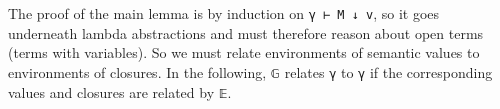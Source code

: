 The proof of the main lemma is by induction on \texttt{γ\ ⊢\ M\ ↓\ v},
so it goes underneath lambda abstractions and must therefore reason
about open terms (terms with variables). So we must relate environments
of semantic values to environments of closures. In the following,
\texttt{𝔾} relates \texttt{γ} to \texttt{γ\textquotesingle{}} if the
corresponding values and closures are related by \texttt{𝔼}.

\begin{fence}
\begin{code}%
\>[0]\AgdaSpace{}%
\AgdaSymbol{:}\AgdaSpace{}%
\AgdaSymbol{\}}\AgdaSpace{}%
\AgdaSpace{}%
\AgdaSpace{}%
\AgdaSpace{}%
\AgdaSpace{}%
\AgdaSpace{}%
\AgdaSpace{}%
\AgdaSpace{}%
\<%
\\
\>[0]\AgdaSpace{}%
\AgdaSymbol{\{}\AgdaSymbol{\}}\AgdaSpace{}%
\AgdaSpace{}%
\AgdaSpace{}%
\AgdaSymbol{=}\AgdaSpace{}%
\AgdaSpace{}%
\AgdaSymbol{:}\AgdaSpace{}%
\AgdaSpace{}%
\AgdaSpace{}%
\AgdaSymbol{\}}\AgdaSpace{}%
\AgdaSpace{}%
\AgdaSpace{}%
\AgdaSymbol{(}\AgdaSpace{}%
\AgdaSymbol{)}\AgdaSpace{}%
\AgdaSymbol{(}\AgdaSpace{}%
\AgdaSymbol{)}\<%
\\
%
\\[\AgdaEmptyExtraSkip]%
\>[0]\AgdaSpace{}%
\AgdaSymbol{:}\AgdaSpace{}%
\AgdaSpace{}%
\AgdaSpace{}%
\<%
\\
\>[0]\AgdaSpace{}%
\AgdaSymbol{\{()\}}\<%
\\
%
\\[\AgdaEmptyExtraSkip]%
\>[0]%
\>[693I]\AgdaSymbol{:}\AgdaSpace{}%
\AgdaSymbol{\}\{}\AgdaSpace{}%
\AgdaSymbol{:}\AgdaSpace{}%
\AgdaSpace{}%
\AgdaSymbol{\}\{}\AgdaSpace{}%
\AgdaSymbol{:}\AgdaSpace{}%
\AgdaSpace{}%
\AgdaSymbol{\}\{}\AgdaSpace{}%
\AgdaSymbol{\}}\<%
\\
\>[.][@{}l@{}]\<[693I]%
\>[6]\AgdaSpace{}%
\AgdaSpace{}%
\AgdaSpace{}%
\AgdaSpace{}%

\end{code}
\end{fence}
